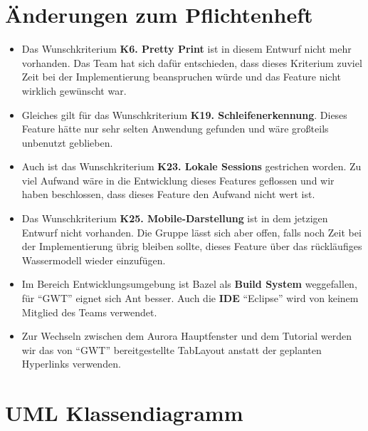 \documentclass[parskip=full,11pt,twoside]{scrbook}
\begin{document}
\section{Änderungen zum Pflichtenheft}
    \begin{itemize}
        \item Das Wunschkriterium \textbf{K6. Pretty Print} ist in diesem Entwurf nicht mehr vorhanden.
            Das Team hat sich dafür entschieden, dass dieses Kriterium zuviel Zeit bei der Implementierung beanspruchen würde und das Feature nicht wirklich gewünscht war.

        \item Gleiches gilt für das Wunschkriterium \textbf{K19. Schleifenerkennung}.
            Dieses Feature hätte nur sehr selten Anwendung gefunden und wäre großteils unbenutzt geblieben.

        \item Auch ist das Wunschkriterium \textbf{K23. Lokale Sessions} gestrichen worden. 
            Zu viel Aufwand wäre in die Entwicklung dieses Features geflossen und wir haben beschlossen, dass dieses Feature den Aufwand nicht wert ist.

        \item Das Wunschkriterium \textbf{K25. Mobile-Darstellung} ist in dem jetzigen Entwurf nicht vorhanden.
            Die Gruppe lässt sich aber offen, falls noch Zeit bei der Implementierung übrig bleiben sollte, dieses Feature über das rückläufiges Wassermodell wieder einzufügen.

        \item Im Bereich Entwicklungsumgebung ist Bazel als \textbf{Build System} weggefallen, für \enquote{GWT} eignet sich Ant besser.
            Auch die \textbf{IDE} \enquote{Eclipse} wird von keinem Mitglied des Teams verwendet.

        \item Zur Wechseln zwischen dem Aurora Hauptfenster und dem Tutorial werden wir das von \enquote{GWT} bereitgestellte TabLayout anstatt der geplanten Hyperlinks verwenden.
    \end{itemize}


\section{UML Klassendiagramm}



    
\end{document}
